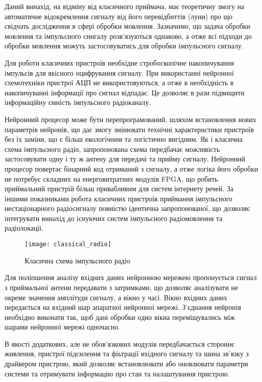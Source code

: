 Даний винахід, на відміну від класичного приймача, має теоретичну змогу 
на автоматичне відокремлення сигналу від його перевідбиттів (луни) про що 
свідчать дослідження в сфері обробки мовлення. Зазначимо, що задача обробки 
мовлення та імпульсного сингалу розв’язуються однаково, а отже всі підходи 
до обробки мовлення можуть застосовуватись для обробки імпульсного сигналу. 

Для роботи класичних пристроїв необхідне стробоскопічне накопичування 
імпульсів для якісного оцифрування сигналу. При використанні нейронної 
схемотехніки пристрої АЦП не використовуються, а отже в необхідність в 
накопичуванні інформації про сигнал відпадає. Це дозволяє в рази підвищити 
інформаційну ємність імпульсного радіоканалу.

Нейронний процесор може бути перепрограмований, шляхом встановлення нових
параметрів нейронів, що дає змогу змінювати технічні характеристики 
пристроїв без їх заміни, що є більш екологічним та логістично вигідним.
Як і класична схема імпульсного радіо, запропонована схема передбачає 
можливість застосовувати одну і ту ж антену для передачі та прийму сигналу. 
Нейронний процесор повертає бінарний код отриманий з сигналу, а отже логіка 
його обробки не потребує складних на енерговитратних модулів FPGA, що 
робить приймальний пристрій більш привабливим для систем інтернету речей. 
За іншими показниками робота класичних пристроїв приймання імпульсного нестаціонарного радіосигналу повністю ідентична запропонованої, що 
дозволяє інтегрувати винахід до існуючих систем імпульсного 
радіомовлення та радіолокації.

\begin{figure}[htbp] \begin{center}
\texttt{[image: classical\_radio]}
\caption{Класична схема імпульсного радіо} \label{fig:emp_radio}
\end{center} \end{figure}

Для поліпшення аналізу вхідних даних нейронною мережею пропонується 
сигнал з приймальної антени передавати з затримками, що дозволяє 
аналізувати не окреме значення амплітуди сигналу, а вікно у часі. 
Вікно вхідних даних передається на вхідний шар апаратної нейронної мережі. 
З'єднання нейронів необхідно виконати так, щоб дані обробки одно вікна 
переміщувались між шарами нейронної мережі одночасно. 

В якості додаткових, але не обов'язкових модулів передбачається стороннє 
живлення, пристрої підсилення та фіьтрації вхідного сигналу та шина зв'язку 
з драйвером пристрою, який дозволяє встановлювати або оновлювати параметри 
системи та отримувати інформацію про стан та налаштування пристрою.

